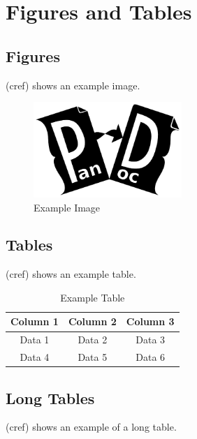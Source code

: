 \documentclass{article}
\begin{document}
\section{Figures and Tables\label{sec:figures_tables}}

\subsection{Figures}
 (cref) shows an example image.

\begin{figure}[H]
    \centering
    \includegraphics[width=0.5\textwidth]{./example-image}
    \caption{Example Image}
    \label{fig:example}
\end{figure}

\subsection{Tables}
 (cref) shows an example table.

\begin{table}[H]
    \centering
    \begin{tabular}{|c|c|c|}
        \hline
        Column 1 & Column 2 & Column 3 \\
        \hline
        Data 1 & Data 2 & Data 3 \\
        Data 4 & Data 5 & Data 6 \\
        \hline
    \end{tabular}
    \caption{Example Table}
    \label{tab:example}
\end{table}

\subsection{Long Tables}
 (cref) shows an example of a long table.
\end{document}
